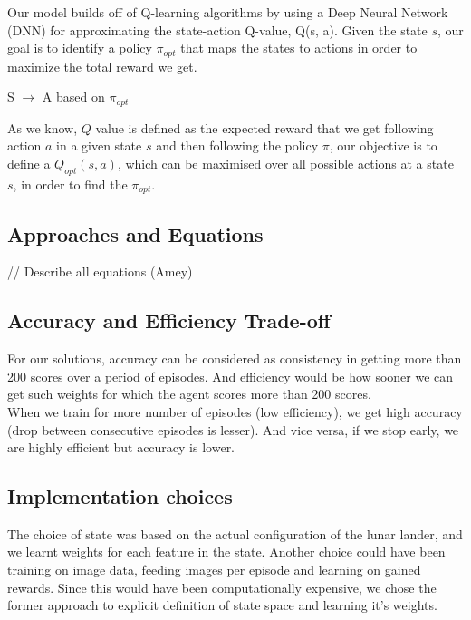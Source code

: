 \documentclass[12pt]{article}
\begin{document}
Our model builds off of Q-learning algorithms by using a Deep Neural Network (DNN) for approximating the state-action Q-value, Q(s, a). 
Given the state $s$, our goal is to identify a policy $\pi_{opt}$ that maps the states to actions in order to maximize the total reward we get.

\begin{center}
S $\rightarrow$ A based on $\pi_{opt}$
\end{center}

As we know, $Q$ value is defined as the expected reward that we get following action $a$ in a given state $s$ and then following the policy $\pi$, our objective is to define a $Q_{opt} (s, a)$, which can be maximised over all possible actions at a state $s$, in order to find the $\pi_{opt}$.

\subsection{Approaches and Equations}

// Describe all equations (Amey)

\subsection{Accuracy and Efficiency Trade-off}

For our solutions, accuracy can be considered as consistency in getting more than 200 scores over a period of episodes. And efficiency would be how sooner we can get such weights for which the agent scores more than 200 scores. \\

When we train for more number of episodes (low efficiency), we get high accuracy (drop between consecutive episodes is lesser). And vice versa, if we stop early, we are highly efficient but accuracy is lower.

\subsection{Implementation choices}

The choice of state was based on the actual configuration of the lunar lander, and we learnt weights for each feature in the state. Another choice could have been training on image data, feeding images per episode and learning on gained rewards. Since this would have been computationally expensive, we chose the former approach to explicit definition of state space and learning it's weights. \\
\end{document}
